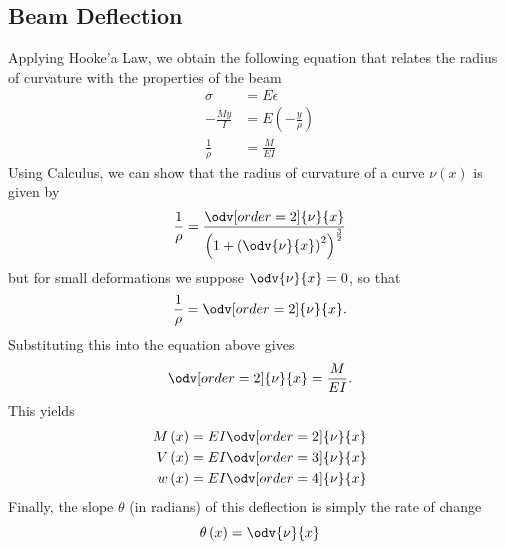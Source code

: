 \documentclass{article}
\begin{document}
\subsection{Beam Deflection}
Applying Hooke'a Law, we obtain the following equation that relates the radius of curvature
with the properties of the beam
\begin{align*}
    \sigma         & = E \epsilon                       \\
    -\frac{M y}{I} & = E \left( -\frac{y}{\rho} \right) \\
    \frac{1}{\rho} & = \frac{M}{E I}
\end{align*}
Using Calculus, we can show that the radius of curvature of a curve \(\nu\left( x \right)\) is given by
\begin{equation*}
    \frac{1}{\rho} = \frac{\odv[order=2]{\nu}{x}}{\left( 1 + \left( \odv{\nu}{x} \right)^2 \right)^{\frac{3}{2}}}
\end{equation*}
but for small deformations we suppose \(\odv{\nu}{x} = 0\), so that
\begin{equation*}
    \frac{1}{\rho} = \odv[order=2]{\nu}{x}.
\end{equation*}
Substituting this into the equation above gives
\begin{equation*}
    \odv[order=2]{\nu}{x} = \frac{M}{E I}.
\end{equation*}
This yields
\begin{align*}
    M\left( x \right) & = EI \odv[order=2]{\nu}{x} \\
    V\left( x \right) & = EI \odv[order=3]{\nu}{x} \\
    w\left( x \right) & = EI \odv[order=4]{\nu}{x}
\end{align*}
Finally, the slope \(\theta\) (in radians) of this deflection is simply the rate of change
\begin{equation*}
    \theta\left( x \right) = \odv{\nu}{x}
\end{equation*}
\end{document}
